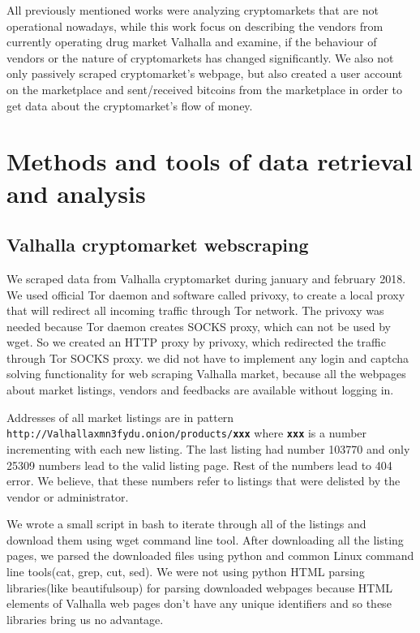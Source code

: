 \documentclass[
  digital, %
  table,   %
  lof,     %
  lot,     %
  oneside
]{fithesis3}
\begin{document}
 All previously mentioned works were analyzing cryptomarkets that are not operational nowadays,
 while this work focus on describing the vendors from currently operating drug market Valhalla 
 and examine, if the behaviour of vendors or the nature of cryptomarkets
 has changed significantly. We also not only passively scraped cryptomarket's webpage,
 but also created a user account on the marketplace and sent/received bitcoins from the marketplace
 in order to get data about the cryptomarket's flow of money.
 
\chapter{Methods and tools of data retrieval and analysis}

\section{Valhalla cryptomarket webscraping}
\label{Valhalla cryptomarket webscraping}
We scraped data from Valhalla cryptomarket
during january and february 2018. 
We used official Tor daemon and software called privoxy, to create a local proxy that will redirect all
incoming traffic through Tor network. The privoxy was needed because Tor daemon creates SOCKS proxy,
which can not be used by wget. So we created an HTTP proxy by privoxy,
which redirected the traffic through Tor SOCKS proxy.
we did not have to implement any login and captcha solving functionality
for web scraping Valhalla market, because all the webpages about market
listings, vendors and feedbacks are available without logging in.

Addresses of all market listings are in pattern\newline
\texttt{http://Valhallaxmn3fydu.onion/products/\textbf{xxx}} where \texttt{\textbf{xxx}}
is a number incrementing with each new listing.
The last listing had number 103770 and only 25309 numbers lead to the valid listing page.
Rest of the numbers lead to 404 error. We believe,
that these numbers refer to listings that were delisted by the vendor or administrator.


We wrote a small script in bash to iterate through all of the listings
and download them using wget command line tool.
After downloading all the listing pages,
we parsed the downloaded files using python and common Linux command line tools(cat, grep, cut, sed).
We were not using python HTML parsing libraries(like beautifulsoup) for parsing downloaded
webpages because HTML elements of Valhalla web pages don't have any unique identifiers
and so these libraries bring us no advantage.
 
\end{document}
